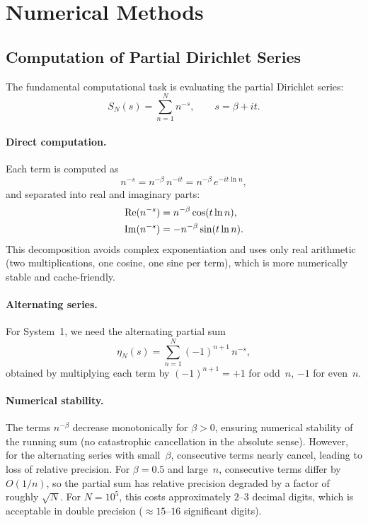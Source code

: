 \section{Numerical Methods}
\label{sec:methods}

\subsection{Computation of Partial Dirichlet Series}
\label{sec:dirichlet}

The fundamental computational task is evaluating the partial Dirichlet series:
\begin{equation}\label{eq:partial-dirichlet}
  S_N(s) = \sum_{n=1}^{N} n^{-s}, \qquad s = \beta + it.
\end{equation}

\paragraph{Direct computation.}
Each term is computed as
\begin{equation}\label{eq:term-decomp}
  n^{-s} = n^{-\beta}\,n^{-it} = n^{-\beta}\,e^{-it\ln n},
\end{equation}
and separated into real and imaginary parts:
\begin{align}
  \operatorname{Re}(n^{-s}) &= n^{-\beta}\cos(t\ln n), \label{eq:re-term}\\
  \operatorname{Im}(n^{-s}) &= -n^{-\beta}\sin(t\ln n). \label{eq:im-term}
\end{align}
This decomposition avoids complex exponentiation and uses only real arithmetic (two
multiplications, one cosine, one sine per term), which is more numerically stable and
cache-friendly.

\paragraph{Alternating series.}
For System~1, we need the alternating partial sum
\begin{equation}\label{eq:eta-partial}
  \eta_N(s) = \sum_{n=1}^{N} (-1)^{n+1}\,n^{-s},
\end{equation}
obtained by multiplying each term by $(-1)^{n+1} = +1$ for odd~$n$, $-1$ for even~$n$.

\paragraph{Numerical stability.}
The terms $n^{-\beta}$ decrease monotonically for $\beta > 0$, ensuring numerical
stability of the running sum (no catastrophic cancellation in the absolute sense).
However, for the alternating series with small~$\beta$, consecutive terms nearly cancel,
leading to loss of relative precision. For $\beta = 0.5$ and large~$n$, consecutive
terms differ by $O(1/n)$, so the partial sum has relative precision degraded by a factor
of roughly $\sqrt{N}$. For $N = 10^5$, this costs approximately $2$--$3$ decimal digits,
which is acceptable in double precision ($\approx 15$--$16$ significant digits).

